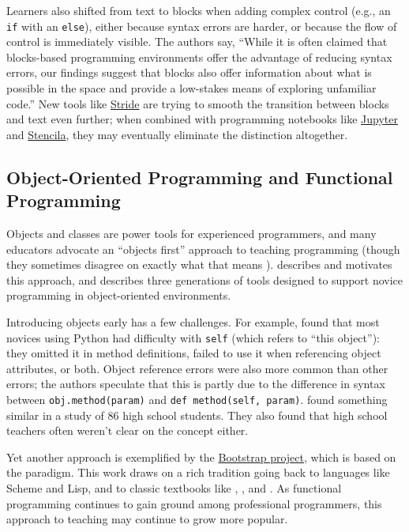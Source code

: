 Learners also shifted from text to blocks when adding complex control
(e.g., an \texttt{if} with an \texttt{else}), either because syntax
errors are harder, or because the flow of control is immediately
visible.  The authors say, ``While it is often claimed that
blocks-based programming environments offer the advantage of reducing
syntax errors, our findings suggest that blocks also offer information
about what is possible in the space and provide a low-stakes means of
exploring unfamiliar code.''  New tools like
\href{https://www.greenfoot.org/frames/}{Stride} are trying to smooth
the transition between blocks and text even further; when combined
with programming notebooks like \href{http://jupyter.org/}{Jupyter}
and \href{http://stenci.la/}{Stencila}, they may eventually eliminate
the distinction altogether.

\subsection*{Object-Oriented Programming and Functional Programming}

Objects and classes are power tools for experienced programmers, and
many educators advocate an ``objects first'' approach to teaching
programming (though they sometimes disagree on exactly what that means
\cite{Benn2007b}).  \cite{Sorv2014} describes and motivates this
approach, and \cite{Koll2015} describes three generations of tools
designed to support novice programming in object-oriented
environments.

Introducing objects early has a few challenges.  For example,
\cite{Mill2016b} found that most novices using Python had difficulty
with \texttt{self} (which refers to ``this object''): they omitted it
in method definitions, failed to use it when referencing object
attributes, or both.  Object reference errors were also more common
than other errors; the authors speculate that this is partly due to
the difference in syntax between \texttt{obj.method(param)} and
\texttt{def method(self, param)}.  \cite{Rago2017} found something
similar in a study of 86 high school students.  They also found that
high school teachers often weren't clear on the concept either.

Yet another approach is exemplified by the
\href{http://www.bootstrapworld.org/}{Bootstrap project}, which is
based on the  paradigm.  This work draws on a rich tradition going
back to languages like Scheme and Lisp, and to classic textbooks like
\cite{Fell2001}, \cite{Frie1995}, and \cite{Abel1996}.  As functional
programming continues to gain ground among professional programmers,
this approach to teaching may continue to grow more popular.

